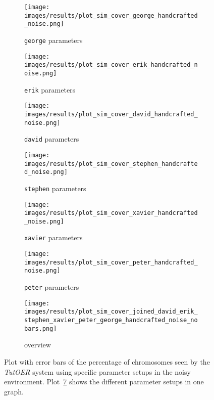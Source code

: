 \begin{figure}[ht]
	\begin{subfigure}{0.48\linewidth}
	\texttt{[image: images/results/plot\_sim\_cover\_george\_handcrafted\_noise.png]}
	\caption{\texttt{george} parameters}
	\label{fig:cover_handcrafted_noise_george}
	\end{subfigure}
	\hfill
	\begin{subfigure}{0.48\linewidth}
	\texttt{[image: images/results/plot\_sim\_cover\_erik\_handcrafted\_noise.png]}
	\caption{\texttt{erik} parameters}
	\label{fig:cover_handcrafted_noise_erik}
	\end{subfigure}
	\begin{subfigure}{0.48\linewidth}
	\texttt{[image: images/results/plot\_sim\_cover\_david\_handcrafted\_noise.png]}
	\caption{\texttt{david} parameters}
	\label{fig:cover_handcrafted_noise_david}
	\end{subfigure}
	\hfill
	\begin{subfigure}{0.48\linewidth}
	\texttt{[image: images/results/plot\_sim\_cover\_stephen\_handcrafted\_noise.png]}
	\caption{\texttt{stephen} parameters}
	\label{fig:cover_handcrafted_noise_stephen}
	\end{subfigure}
	\begin{subfigure}{0.48\linewidth}
	\texttt{[image: images/results/plot\_sim\_cover\_xavier\_handcrafted\_noise.png]}
	\caption{\texttt{xavier} parameters}
	\label{fig:cover_handcrafted_noise_xavier}
	\end{subfigure}
	\hfill
	\begin{subfigure}{0.48\linewidth}
	\texttt{[image: images/results/plot\_sim\_cover\_peter\_handcrafted\_noise.png]}
	\caption{\texttt{peter} parameters}
	\label{fig:cover_handcrafted_noise_peter}
	\end{subfigure}
	\begin{subfigure}{\linewidth}
	\texttt{[image: images/results/plot\_sim\_cover\_joined\_david\_erik\_stephen\_xavier\_peter\_george\_handcrafted\_noise\_nobars.png]}
	\caption{overview}
	\label{fig:cover_handcrafted_noise_overview_group1}
	\end{subfigure}
	\caption{Plot with error bars of the percentage of chromosomes seen by the \emph{TutOER}
	system using specific parameter setups in the noisy environment.
	Plot~\ref{fig:cover_handcrafted_noise_overview_group1} shows the
	different parameter setups in one graph.}
	\label{fig:cover_handcrafted_noise_container_group1}
\end{figure}

